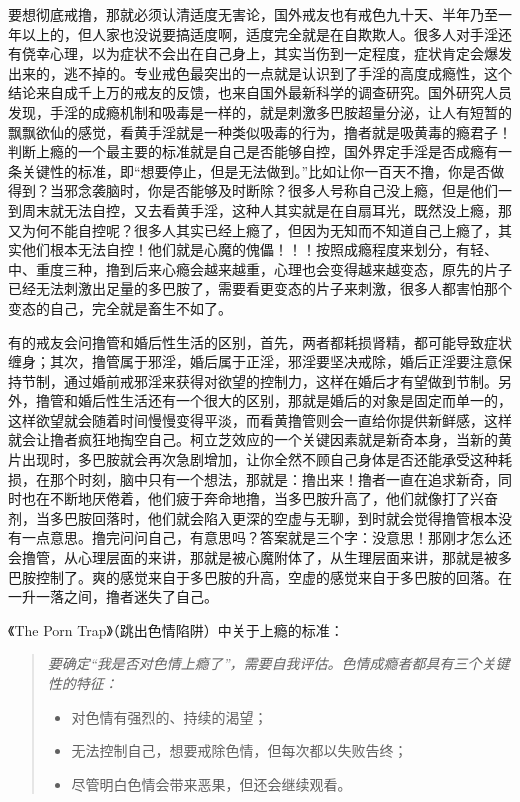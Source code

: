 要想彻底戒撸，那就必须认清适度无害论，国外戒友也有戒色九十天、半年乃至一年以上的，但人家也没说要搞适度啊，适度完全就是在自欺欺人。很多人对手淫还有侥幸心理，以为症状不会出在自己身上，其实当伤到一定程度，症状肯定会爆发出来的，逃不掉的。专业戒色最突出的一点就是认识到了手淫的高度成瘾性，这个结论来自成千上万的戒友的反馈，也来自国外最新科学的调查研究。国外研究人员发现，手淫的成瘾机制和吸毒是一样的，就是刺激多巴胺超量分泌，让人有短暂的飘飘欲仙的感觉，看黄手淫就是一种类似吸毒的行为，撸者就是吸黄毒的瘾君子！判断上瘾的一个最主要的标准就是自己是否能够自控，国外界定手淫是否成瘾有一条关键性的标准，即“想要停止，但是无法做到。”比如让你一百天不撸，你是否做得到？当邪念袭脑时，你是否能够及时断除？很多人号称自己没上瘾，但是他们一到周末就无法自控，又去看黄手淫，这种人其实就是在自扇耳光，既然没上瘾，那又为何不能自控呢？很多人其实已经上瘾了，但因为无知而不知道自己上瘾了，其实他们根本无法自控！他们就是心魔的傀儡！！！按照成瘾程度来划分，有轻、中、重度三种，撸到后来心瘾会越来越重，心理也会变得越来越变态，原先的片子已经无法刺激出足量的多巴胺了，需要看更变态的片子来刺激，很多人都害怕那个变态的自己，完全就是畜生不如了。

有的戒友会问撸管和婚后性生活的区别，首先，两者都耗损肾精，都可能导致症状缠身；其次，撸管属于邪淫，婚后属于正淫，邪淫要坚决戒除，婚后正淫要注意保持节制，通过婚前戒邪淫来获得对欲望的控制力，这样在婚后才有望做到节制。另外，撸管和婚后性生活还有一个很大的区别，那就是婚后的对象是固定而单一的，这样欲望就会随着时间慢慢变得平淡，而看黄撸管则会一直给你提供新鲜感，这样就会让撸者疯狂地掏空自己。柯立芝效应的一个关键因素就是新奇本身，当新的黄片出现时，多巴胺就会再次急剧增加，让你全然不顾自己身体是否还能承受这种耗损，在那个时刻，脑中只有一个想法，那就是：撸出来！撸者一直在追求新奇，同时也在不断地厌倦着，他们疲于奔命地撸，当多巴胺升高了，他们就像打了兴奋剂，当多巴胺回落时，他们就会陷入更深的空虚与无聊，到时就会觉得撸管根本没有一点意思。撸完问问自己，有意思吗？答案就是三个字：没意思！那刚才怎么还会撸管，从心理层面的来讲，那就是被心魔附体了，从生理层面来讲，那就是被多巴胺控制了。爽的感觉来自于多巴胺的升高，空虚的感觉来自于多巴胺的回落。在一升一落之间，撸者迷失了自己。

《The Porn Trap》（跳出色情陷阱）中关于上瘾的标准：

\begin{quotation}\it
    要确定“我是否对色情上瘾了”，需要自我评估。色情成瘾者都具有三个关键性的特征：\begin{itemize}
        \item 对色情有强烈的、持续的渴望；
        \item 无法控制自己，想要戒除色情，但每次都以失败告终；
        \item 尽管明白色情会带来恶果，但还会继续观看。
    \end{itemize}
\end{quotation}

